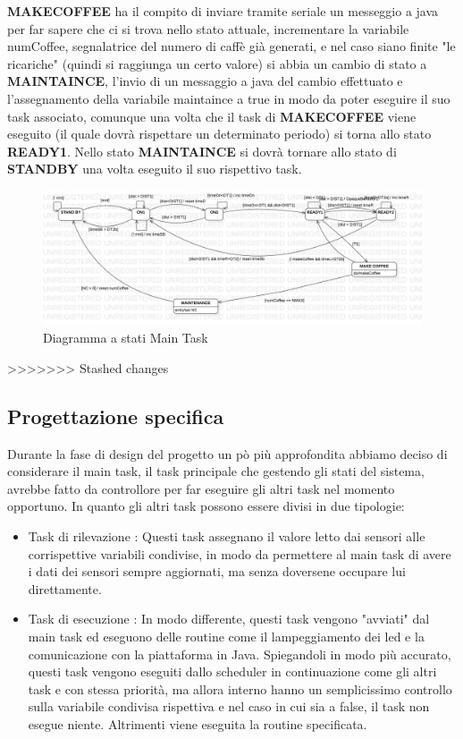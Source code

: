 \documentclass[a4paper]{article}
\begin{document}
\begin{itemize}
\textbf{MAKECOFFEE} ha il compito di inviare tramite seriale un messeggio a java per far sapere che ci si trova nello stato attuale, incrementare la variabile numCoffee, segnalatrice del numero di caffè già generati, e nel caso siano finite "le ricariche" (quindi si raggiunga un certo valore) si abbia un cambio di stato a \textbf{MAINTAINCE}, l'invio di un messaggio a java del cambio effettuato e l'assegnamento della variabile maintaince a true in modo da poter eseguire il suo task associato, comunque una volta che il task di \textbf{MAKECOFFEE} viene eseguito (il quale dovrà rispettare un determinato periodo) si torna allo stato \textbf{READY1}.
Nello stato \textbf{MAINTAINCE} si dovrà tornare allo stato di \textbf{STANDBY} una volta eseguito il suo rispettivo task.

\begin{figure}[h!]
	\includegraphics[scale = 0.30]{MainTask.png}
	\caption{Diagramma a stati Main Task}
\end{figure}
>>>>>>> Stashed changes




\end{itemize}
\subsection*{Progettazione specifica}
Durante la fase di design del progetto un pò più approfondita abbiamo deciso di considerare il main task,  il task principale che gestendo gli stati del sistema, avrebbe fatto da controllore per far eseguire gli altri task nel momento opportuno. In quanto gli altri task possono essere divisi in due tipologie:
\begin{itemize}
\item {Task di rilevazione }:
Questi task assegnano il valore letto dai sensori alle corrispettive variabili condivise, in modo da permettere al main task di avere i dati dei sensori sempre aggiornati, ma senza doversene occupare lui direttamente.


\item {Task di esecuzione }:
In modo differente, questi task vengono "avviati" dal main task ed eseguono delle routine come il lampeggiamento dei led e la comunicazione con la piattaforma in Java.
Spiegandoli in modo più accurato, questi task vengono eseguiti dallo scheduler in continuazione come gli altri task e con stessa priorità, ma allora interno hanno un semplicissimo controllo sulla variabile condivisa rispettiva e nel caso in cui sia a false, il task non esegue niente. Altrimenti viene eseguita la routine specificata.

\end{itemize}
\end{document}
